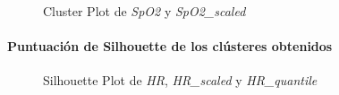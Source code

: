 \begin{figure}[ht]
    \centering
    \hfill
    \caption{Cluster Plot de \textit{SpO2} y \textit{SpO2\_scaled}}\label{fig:per_pc_spo2}
\end{figure}


\paragraph{Puntuación de Silhouette de los clústeres obtenidos}

\begin{figure}[H]
    \centering
    \caption{Silhouette Plot de \textit{HR}, \textit{HR\_scaled} y \textit{HR\_quantile}}\label{fig:per_si_fc}
\end{figure}


